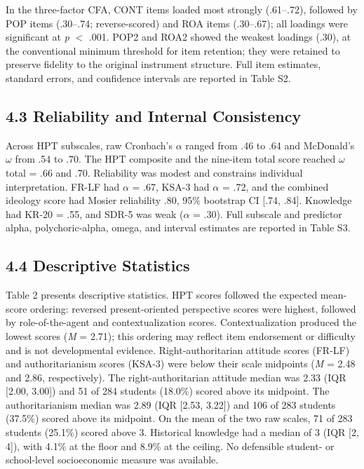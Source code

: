 \documentclass[PCJ,Unicode,screen,mode=plain]{cedram}
\begin{document}
In the three-factor CFA, CONT items loaded most strongly (.61--.72), followed by POP items (.30--.74; reverse-scored) and ROA items (.30--.67); all loadings were significant at \emph{p} $<$ .001. POP2 and ROA2 showed the weakest loadings (.30), at the conventional minimum threshold for item retention; they were retained to preserve fidelity to the original instrument structure. Full item estimates, standard errors, and confidence intervals are reported in Table S2.

\subsection*{4.3 Reliability and Internal Consistency}\label{reliability-and-internal-consistency}

Across HPT subscales, raw Cronbach's \(\alpha\) ranged from .46 to .64 and McDonald's \(\omega\) from .54 to .70. The HPT composite and the nine-item total score reached \(\omega\) total = .66 and .70. Reliability was modest and constrains individual interpretation. FR-LF
had \(\alpha\) = .67, KSA-3 had \(\alpha\) = .72, and the combined
ideology score had Mosier reliability .80, 95\% bootstrap CI [.74, .84].
Knowledge had KR-20 = .55, and SDR-5 was weak (\(\alpha\) = .30). Full
subscale and predictor alpha, polychoric-alpha, omega, and interval estimates
are reported in Table S3.

\subsection*{4.4 Descriptive Statistics}\label{descriptive-statistics}

Table 2 presents descriptive statistics. HPT scores followed the expected mean-score ordering: reversed present-oriented perspective scores were highest, followed by role-of-the-agent and contextualization scores. Contextualization produced the lowest scores (\emph{M} = 2.71); this ordering may reflect item endorsement or difficulty and is not developmental evidence. Right-authoritarian attitude scores (FR-LF) and authoritarianism scores (KSA-3) were below their scale midpoints (\emph{M} = 2.48 and 2.86, respectively). The right-authoritarian attitude median was 2.33 (IQR [2.00, 3.00]) and 51 of 284 students (18.0\%) scored above its midpoint. The authoritarianism median was 2.89 (IQR [2.53, 3.22]) and 106 of 283 students (37.5\%) scored above its midpoint. On the mean of the two raw scales, 71 of 283 students (25.1\%) scored above 3. Historical knowledge had a median of 3 (IQR [2, 4]), with 4.1\% at the floor and 8.9\% at the ceiling. No defensible student- or school-level socioeconomic measure was available.
\end{document}
